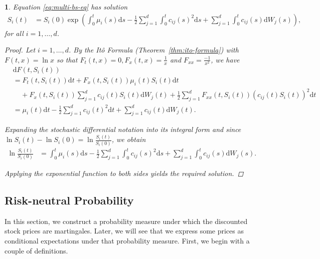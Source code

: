 \documentclass[english]{article}
\numberwithin{equation}{section}
\numberwithin{figure}{section}
\theoremstyle{bolddescit}
\newtheorem{theorem}{\protect\theoremname}[section]
\theoremstyle{definition}
\theoremstyle{definition}
\theoremstyle{plain}
\theoremstyle{plain}
\theoremstyle{bolddesc}
\theoremstyle{plain}
\theoremstyle{remark}
\providecommand{\theoremname}{Theorem}
\begin{document}
\begin{theorem}\label{thm:bs-solution}
  Equation \eqref{eq:multi-bs-eq} has solution
  \begin{align*}
    S_i(t) &= S_i(0) \exp \left( \int_0^t \mu_i(s) \mathrm{d}s - \frac{1}{2} \sum_{j=1}^{d} \int_0^t c_{ij}(s)^2 \mathrm{d}s + \sum_{j=1}^d \int_0^t c_{ij}(s) \mathrm{d}W_j(s) \right),
  \end{align*}
  for all $i=1,\ldots,d$.

  \begin{proof}
    Let $i = 1,\ldots,d$. By the It\^o Formula (Theorem~\ref{thm:ito-formula}) with $F(t,x) = \ln x$ so that $F_t(t,x) = 0, F_x(t,x) = \frac{1}{x}$ and $F_{xx} = \frac{-1}{x^2}$, we have
    \begin{align*}
      &\mathrm{d}F(t,S_i(t))\\
      &= F_t(t,S_i(t)) \mathrm{d}t + F_x(t,S_i(t)) \mu_i(t) S_i(t) \mathrm{d}t\\
      &\ \ \ \ \ + F_x(t,S_i(t)) \sum_{j=1}^d c_{ij}(t) S_i(t) \mathrm{d}W_j(t) + \frac{1}{2} \sum_{j=1}^d F_{xx}(t,S_i(t)) (c_{ij}(t) S_i(t))^2 \mathrm{d}t\\
      &= \mu_i(t) \mathrm{d}t
      - \frac{1}{2} \sum_{j=1}^d c_{ij}(t)^2 \mathrm{d}t
      + \sum_{j=1}^d c_{ij}(t) \mathrm{d}W_j(t).
    \end{align*}

    Expanding the stochastic differential notation into its integral form and since $\ln S_i(t) - \ln S_i(0) = \ln \frac{S_i(t)}{S_i(0)}$, we obtain
    \begin{align*}
      \ln \frac{S_i(t)}{S_i(0)}
      &= \int_0^t \mu_i(s) \mathrm{d}s
      - \frac{1}{2} \sum_{j=1}^d \int_0^t c_{ij}(s)^2 \mathrm{d}s
      + \sum_{j=1}^d \int_0^t c_{ij}(s) \mathrm{d}W_j(s).
    \end{align*}

    Applying the exponential function to both sides yields the required solution.
  \end{proof}
\end{theorem}

\subsection{Risk-neutral Probability}

In this section, we construct a probability measure under which the discounted stock prices are martingales. Later, we will see that we express some prices as conditional expectations under that probability measure. First, we begin with a couple of definitions.
\end{document}
